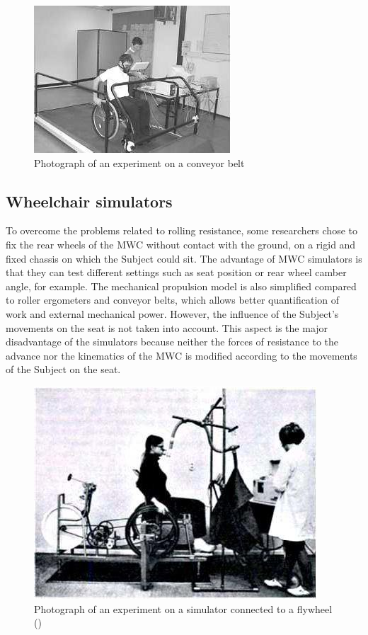 \begin{figure}[h]
\center
\includegraphics[scale = 40]{images/tapi_roulant}
\caption{Photograph of an experiment on a conveyor belt \cite{van2006manual}}
\label{tapi_roulant}
\end{figure}

\subsection{Wheelchair simulators}
To overcome the problems related to rolling resistance, some researchers chose to fix the rear wheels of the MWC without contact with the ground, on a rigid and fixed chassis on which the Subject could sit. The advantage of MWC simulators is that they can test different settings such as seat position or rear wheel camber angle, for example. The mechanical propulsion model is also simplified compared to roller ergometers and conveyor belts, which allows better quantification of work and external mechanical power.   However, the influence of the Subject's movements on the seat is not taken into account. This aspect is the major disadvantage of the simulators because neither the forces of resistance to the advance nor the kinematics of the MWC is modified according to the movements of the Subject on the seat.

\begin{figure}[h]
\center
\includegraphics[scale = 30]{images/SFR}
\caption{Photograph of an experiment on a simulator connected to a flywheel (\cite{brattgaard1970energy})}
\label{SFR}
\end{figure}

